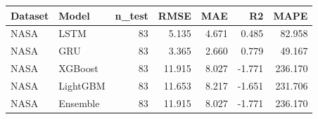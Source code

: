 \begin{tabular}{llrrrrr}
\toprule
Dataset & Model & n_test & RMSE & MAE & R2 & MAPE \\
\midrule
NASA & LSTM & 83 & 5.135 & 4.671 & 0.485 & 82.958 \\
NASA & GRU & 83 & 3.365 & 2.660 & 0.779 & 49.167 \\
NASA & XGBoost & 83 & 11.915 & 8.027 & -1.771 & 236.170 \\
NASA & LightGBM & 83 & 11.653 & 8.217 & -1.651 & 231.706 \\
NASA & Ensemble & 83 & 11.915 & 8.027 & -1.771 & 236.170 \\
\bottomrule
\end{tabular}
